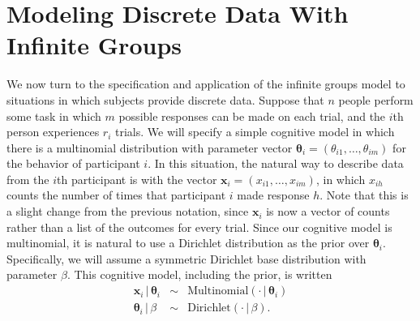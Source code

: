 \documentclass[authoryear]{elsarticle}
\newcommand{\condon}{\,|\,}
\newcommand{\vctr}[1]{\bm{#1}}
\begin{document}
\section{Modeling Discrete Data With Infinite Groups}

We now turn to the specification and application of the infinite groups model
to situations in which subjects provide discrete data. Suppose that
$n$ people perform some task in which $m$ possible responses can be
made on each trial, and the $i$th person experiences $r_i$ trials. We will specify a
simple cognitive model in which there is a multinomial distribution with
parameter vector $\vctr{\theta}_i = (\theta_{i1}, \ldots, \theta_{im})$
for the behavior of participant $i$. In this situation, the
natural way to describe data from the $i$th participant is with the vector
$\vctr{x}_i = (x_{i1}, \ldots, x_{im})$, in which $x_{ih}$ counts the number of
times that participant $i$ made response $h$. Note that this is a slight change
from the previous notation, since $\vctr{x}_i$ is now a vector of counts rather
than a list of the outcomes for every trial. Since our cognitive model is
multinomial, it is natural to use a Dirichlet distribution as the prior over $\vctr{\theta}_i$.
Specifically, we will assume a symmetric Dirichlet base distribution
with parameter $\beta$. This cognitive model, including the prior, is written
\[
       \begin{array}{rcl}
        \vctr{x}_{i} \condon \vctr{\theta}_i & \sim & \mbox{Multinomial}
        (\cdot \condon \vctr{\theta}_i) \\
        \vctr{\theta}_i \condon \beta & \sim & \mbox{Dirichlet}
        (\cdot \condon\beta).
       \end{array}
\]
\end{document}
